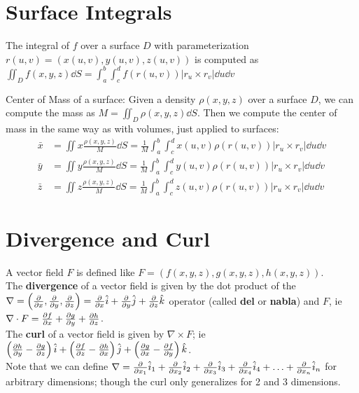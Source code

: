 \documentclass[letterpaper,11pt]{article}
\begin{document}
\section*{Surface Integrals}
The integral of $f$ over a surface $D$ with parameterization $r(u, v) = (x(u, v), y(u, v), z(u, v))$ is computed as
$\iint_D f(x, y, z) \dd{S} = \int_a^b \int_c^d f(r(u, v)) |r_u \times r_v| \dd{u} \dd{v}$

Center of Mass of a surface: Given a density $\rho(x, y, z)$ over a surface $D$, we can compute the mass as
$M = \iint_D \rho(x, y, z) \dd{S}$.
Then we compute the center of mass in the same way as with volumes, just applied to surfaces:
\begin{align*}
  \bar{x} &= \iint x \frac{\rho(x, y, z)}{M} \dd{S} = \frac{1}{M} \int_a^b \int_c^d x(u, v) \rho(r(u, v)) |r_u \times r_v| \dd{u} \dd{v}\\
  \bar{y} &= \iint y \frac{\rho(x, y, z)}{M} \dd{S} = \frac{1}{M} \int_a^b \int_c^d y(u, v) \rho(r(u, v)) |r_u \times r_v| \dd{u} \dd{v}\\
  \bar{z} &= \iint z \frac{\rho(x, y, z)}{M} \dd{S} = \frac{1}{M} \int_a^b \int_c^d z(u, v) \rho(r(u, v)) |r_u \times r_v| \dd{u} \dd{v}
\end{align*}
\section*{Divergence and Curl}
A vector field $F$ is defined like $F = \left( f(x, y, z), g(x, y, z), h(x, y, z) \right)$.\\
The {\bf divergence} of a vector field is given by the dot product of the
$\nabla = \left( \frac{\partial }{\partial x}, \frac{\partial }{\partial y}, \frac{\partial }{\partial z} \right) = \frac{\partial }{\partial x} \hat{i} + \frac{\partial }{\partial y} \hat{j} + \frac{\partial }{\partial z} \hat{k}$
operator (called {\bf del} or {\bf nabla}) and $F$, ie
$\nabla \cdot F = \frac{\partial f}{\partial x} + \frac{\partial g}{\partial y} + \frac{\partial h}{\partial z}$.\\
The {\bf curl} of a vector field is given by $\nabla \times F$; ie
$\left( \frac{\partial h}{\partial y} - \frac{\partial g}{\partial z} \right) \hat{i} + \left( \frac{\partial f}{\partial z} - \frac{\partial h}{\partial x} \right) \hat{j} + \left( \frac{\partial g}{\partial x} - \frac{\partial f}{\partial y} \right) \hat{k}$.\\
Note that we can define $\nabla = \frac{\partial }{\partial x_1} \hat{i}_1 + \frac{\partial }{\partial x_2} \hat{i}_2 + \frac{\partial }{\partial x_3} \hat{i}_3 + \frac{\partial }{\partial x_4} \hat{i}_4 + \ldots + \frac{\partial }{\partial x_n} \hat{i}_n$
for arbitrary dimensions; though the curl only generalizes for 2 and 3 dimensions.
\end{document}
